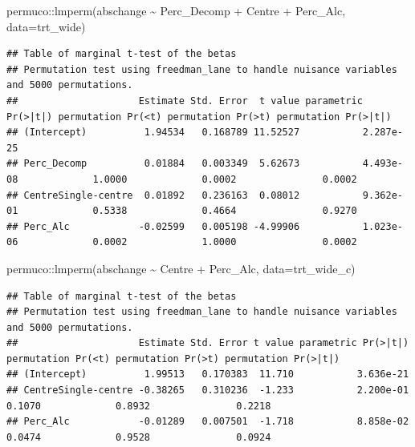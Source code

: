\documentclass[
]{article}
\newenvironment{Shaded}{\begin{snugshade}}{\end{snugshade}}
\newcommand{\AttributeTok}[1]{\textcolor[rgb]{0.77,0.63,0.00}{#1}}
\newcommand{\FunctionTok}[1]{\textcolor[rgb]{0.00,0.00,0.00}{#1}}
\newcommand{\NormalTok}[1]{#1}
\newcommand{\SpecialCharTok}[1]{\textcolor[rgb]{0.00,0.00,0.00}{#1}}
\begin{document}
\begin{Shaded}
\begin{Highlighting}[]
\NormalTok{permuco}\SpecialCharTok{::}\FunctionTok{lmperm}\NormalTok{(abschange }\SpecialCharTok{\textasciitilde{}}\NormalTok{ Perc\_Decomp }\SpecialCharTok{+}\NormalTok{ Centre }\SpecialCharTok{+}\NormalTok{ Perc\_Alc, }\AttributeTok{data=}\NormalTok{trt\_wide)}
\end{Highlighting}
\end{Shaded}

\begin{verbatim}
## Table of marginal t-test of the betas
## Permutation test using freedman_lane to handle nuisance variables and 5000 permutations.
##                     Estimate Std. Error  t value parametric Pr(>|t|) permutation Pr(<t) permutation Pr(>t) permutation Pr(>|t|)
## (Intercept)          1.94534   0.168789 11.52527           2.287e-25                                                           
## Perc_Decomp          0.01884   0.003349  5.62673           4.493e-08             1.0000             0.0002               0.0002
## CentreSingle-centre  0.01892   0.236163  0.08012           9.362e-01             0.5338             0.4664               0.9270
## Perc_Alc            -0.02599   0.005198 -4.99906           1.023e-06             0.0002             1.0000               0.0002
\end{verbatim}

\begin{Shaded}
\begin{Highlighting}[]
\NormalTok{permuco}\SpecialCharTok{::}\FunctionTok{lmperm}\NormalTok{(abschange }\SpecialCharTok{\textasciitilde{}}\NormalTok{ Centre }\SpecialCharTok{+}\NormalTok{ Perc\_Alc, }\AttributeTok{data=}\NormalTok{trt\_wide\_c)}
\end{Highlighting}
\end{Shaded}

\begin{verbatim}
## Table of marginal t-test of the betas
## Permutation test using freedman_lane to handle nuisance variables and 5000 permutations.
##                     Estimate Std. Error t value parametric Pr(>|t|) permutation Pr(<t) permutation Pr(>t) permutation Pr(>|t|)
## (Intercept)          1.99513   0.170383  11.710           3.636e-21                                                           
## CentreSingle-centre -0.38265   0.310236  -1.233           2.200e-01             0.1070             0.8932               0.2218
## Perc_Alc            -0.01289   0.007501  -1.718           8.858e-02             0.0474             0.9528               0.0924
\end{verbatim}
\end{document}
